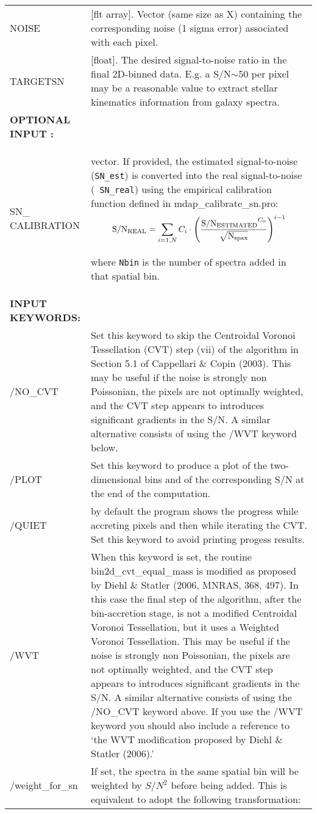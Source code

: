 \begin{center}
\begin{longtable}{p{2.7cm}| p{11.1cm}}
%
NOISE  &[flt array]. Vector (same size as X) containing the corresponding
            noise (1 sigma error) associated with each pixel.\\
%
TARGETSN & [float]. The desired signal-to-noise ratio in the final
            2D-binned data. E.g. a S/N$\sim$50 per pixel may be a
            reasonable value to extract stellar kinematics
            information from galaxy spectra.\\
\hline
{\bf  OPTIONAL INPUT :}      &    \\
\hline
SN\_ CALIBRATION & vector. If provided, the estimated signal-to-noise
             ({\tt SN\_est}) is converted into the real signal-to-noise ({\tt
             SN\_real}) using the empirical calibration function defined in
            mdap\_calibrate\_sn.pro:
   \[
    {\rm S/N_{REAL}} = \sum_{i=1,N} C_i \cdot \left( \frac{{\rm S/N_{ESTIMATED}}^{C_0}}{ \sqrt{{\rm N}_{\rm spax} }} \right)^{i-1} 
   \]

where {\tt Nbin} is the number of spectra added in that spatial bin.\\
%
\hline
{\bf  INPUT KEYWORDS:}      &    \\
  /NO\_CVT&  Set this keyword to skip the Centroidal Voronoi Tessellation
           (CVT) step (vii) of the algorithm in Section 5.1 of
           Cappellari \& Copin (2003).
           This may be useful if the noise is strongly non Poissonian,
           the pixels are not optimally weighted, and the CVT step
           appears to introduces significant gradients in the S/N.
           A similar alternative consists of using the /WVT keyword below.\\
%
    /PLOT&   Set this keyword to produce a plot of the two-dimensional
           bins and of the corresponding S/N at the end of the
           computation.\\
%
   /QUIET&   by default the program shows the progress while accreting
           pixels and then while iterating the CVT. Set this keyword
           to avoid printing progess results.\\
%
     /WVT&   When this keyword is set, the routine bin2d\_cvt\_equal\_mass is
           modified as proposed by Diehl \& Statler (2006, MNRAS, 368, 497).
           In this case the final step of the algorithm, after the bin-accretion
           stage, is not a modified Centroidal Voronoi Tessellation, but it uses
           a Weighted Voronoi Tessellation.
           This may be useful if the noise is strongly non Poissonian,
           the pixels are not optimally weighted, and the CVT step
           appears to introduces significant gradients in the S/N.
           A similar alternative consists of using the /NO\_CVT keyword above.
           If you use the /WVT keyword you should also include a reference to
           `the WVT modification proposed by Diehl \& Statler (2006).'\\
%
/weight\_for\_sn & If set, the spectra in the same spatial bin will be
                 weighted by $S/N^2$ before being added. This is equivalent to adopt the following transformation:


\end{longtable}
\end{center}
